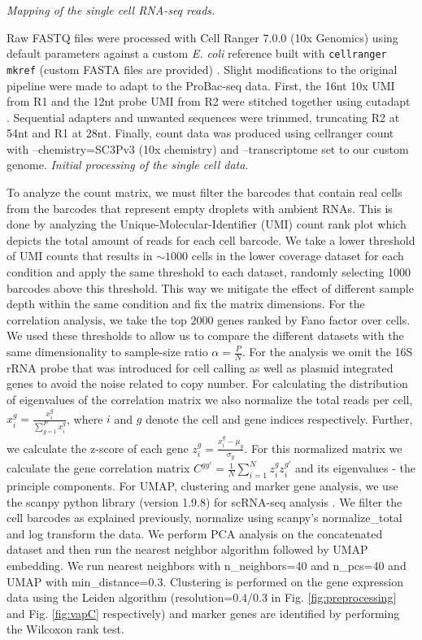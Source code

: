 \documentclass[12pt]{article}
\begin{document}
\vspace{0.5cm}
\newline
\textit{Mapping of the single cell RNA-seq reads.}\par
Raw FASTQ files were processed with Cell Ranger 7.0.0 (10x Genomics) \cite{cellranger} using default parameters against a custom \textit{E. coli} reference built with \verb|cellranger mkref| (custom FASTA files are provided) \cite{Zheng2017}. Slight modifications to the original pipeline were made to adapt to the ProBac-seq \cite{McNulty2023} data. First, the 16nt 10x UMI from R1 and the 12nt probe UMI from R2 were stitched together using cutadapt \cite{EJ200}. Sequential adapters and unwanted sequences were trimmed, truncating R2 at 54nt and R1 at 28nt. Finally, count data was produced using cellranger count with --chemistry=SC3Pv3 (10x chemistry) and --transcriptome set to our custom genome.
\vspace{0.5cm}
\newline
\textit{Initial processing of the single cell data.}\par
To analyze the count matrix, we must filter the barcodes that contain real cells from the barcodes that represent empty droplets with ambient RNAs. This is done by analyzing the Unique-Molecular-Identifier (UMI) count rank plot which depicts the total amount of reads for each cell barcode. We take a lower threshold of UMI counts that results in $\sim1000$ cells in the lower coverage dataset for each condition and apply the same threshold to each dataset, randomly selecting 1000 barcodes above this threshold. This way we mitigate the effect of different sample depth within the same condition and fix the matrix dimensions. For the correlation analysis, we take the top $2000$ genes ranked by Fano factor over cells. We used these thresholds to allow us to compare the different datasets with the same dimensionality to sample-size ratio $\alpha=\frac{P}{N}$. For the analysis we omit the 16S rRNA probe that was introduced for cell calling as well as plasmid integrated genes to avoid the noise related to copy number. For calculating the distribution of eigenvalues of the correlation matrix we also normalize the total reads per cell, $x_i^g=\frac{x_i^g}{\sum_{g=1}^{P}{x_i^g}}$, where $i$ and $g$ denote the cell and gene indices respectively. Further, we calculate the z-score of each gene $z_i^g=\frac{x_i^g-\mu_g}{\sigma_g}$. For this normalized matrix we calculate the gene correlation matrix $C^{gg'}=\frac{1}{N}\sum_{i=1}^{N}{z_i^gz_i^{g'}}$ and its eigenvalues - the principle components. For UMAP, clustering and marker gene analysis, we use the scanpy python library (version 1.9.8) for scRNA-seq analysis \cite{Wolf2018}. We filter the cell barcodes as explained previously, normalize using scanpy's normalize\_total and log transform the data. We perform PCA analysis on the concatenated dataset and then run the nearest neighbor algorithm followed by UMAP embedding. We run nearest neighbors with n\_neighbors=40 and n\_pcs=40 and UMAP with min\_distance=0.3. Clustering is performed on the gene expression data using the Leiden algorithm \cite{Traag2019} (resolution=0.4/0.3 in Fig. \ref{fig:preprocessing} and Fig. \ref{fig:vapC} respectively) and marker genes are identified by performing the Wilcoxon rank test.
\end{document}
